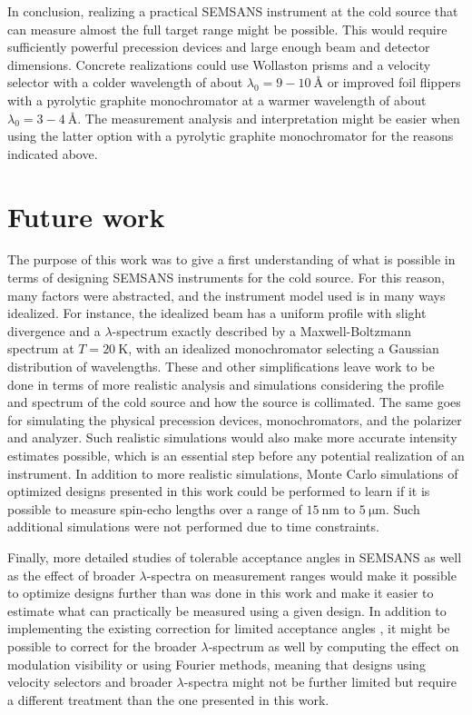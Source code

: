 In conclusion, realizing a practical SEMSANS instrument at the cold source that can measure almost the full target range might be possible. This would require sufficiently powerful precession devices and large enough beam and detector dimensions. Concrete realizations could use Wollaston prisms and a velocity selector with a colder wavelength of about $\lambda_0 = 9 - 10~\unit{\angstrom}$ or improved foil flippers with a pyrolytic graphite monochromator at a warmer wavelength of about $\lambda_0 = 3 - 4~\unit{\angstrom}$. The measurement analysis and interpretation might be easier when using the latter option with a pyrolytic graphite monochromator for the reasons indicated above.

\section{Future work}
\label{c7.1}
The purpose of this work was to give a first understanding of what is possible in terms of designing SEMSANS instruments for the cold source. For this reason, many factors were abstracted, and the instrument model used is in many ways idealized. For instance, the idealized beam has a uniform profile with slight divergence and a $\lambda$-spectrum exactly described by a Maxwell-Boltzmann spectrum at $T= \SI{20}{\kelvin}$, with an idealized monochromator selecting a Gaussian distribution of wavelengths. These and other simplifications leave work to be done in terms of more realistic analysis and simulations considering the profile and spectrum of the cold source and how the source is collimated. The same goes for simulating the physical precession devices, monochromators, and the polarizer and analyzer. Such realistic simulations would also make more accurate intensity estimates possible, which is an essential step before any potential realization of an instrument. In addition to more realistic simulations, Monte Carlo simulations of optimized designs presented in this work could be performed to learn if it is possible to measure spin-echo lengths over a range of $\SI{15}{\nano\meter}$ to $\SI{5}{\micro\meter}$. Such additional simulations were not performed due to time constraints.

Finally, more detailed studies of tolerable acceptance angles in SEMSANS as well as the effect of broader $\lambda$-spectra on measurement ranges would make it possible to optimize designs further than was done in this work and make it easier to estimate what can practically be measured using a given design. In addition to implementing the existing correction for limited acceptance angles \cite{kusmin2017}, it might be possible to correct for the broader $\lambda$-spectrum as well by computing the effect on modulation visibility or using Fourier methods, meaning that designs using velocity selectors and broader $\lambda$-spectra might not be further limited but require a different treatment than the one presented in this work.


